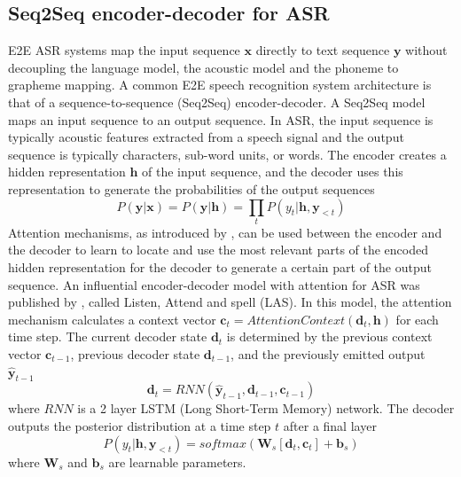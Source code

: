 \documentclass[11pt]{article}
\begin{document}
\subsection{Seq2Seq encoder-decoder for ASR}
E2E ASR systems map the input sequence $\boldsymbol x$ directly to text sequence $\boldsymbol y$ without decoupling the language model, the acoustic model and the phoneme to grapheme mapping. 
A common E2E speech recognition system architecture is that of a sequence-to-sequence (Seq2Seq) \citep{sutskever2014sequence} encoder-decoder. A Seq2Seq model maps an input sequence to an output sequence. In ASR, the input sequence is typically acoustic features extracted from a speech signal and the output sequence is typically characters, sub-word units, or words. The encoder creates a hidden representation $\boldsymbol h$ of the input sequence, and the decoder uses this representation to generate the probabilities of the output sequences
\begin{equation}
    P(\boldsymbol y|\boldsymbol x) = P(\boldsymbol y|\boldsymbol h) = 
    \prod_t P(y_t|\boldsymbol h, \boldsymbol{y}_{<t})
\end{equation}
Attention mechanisms, as introduced by \citet{bahdanau2014neural}, can be used between the encoder and the decoder to learn to locate and use the most relevant parts of the encoded hidden representation for the decoder to generate a certain part of the output sequence. An influential encoder-decoder model with attention for ASR was published by \citet{chan2016listen}, called Listen, Attend and spell (LAS). In this model, the attention mechanism calculates a context vector $\boldsymbol{c}_t = AttentionContext(\boldsymbol{d}_{t},\boldsymbol{h})$ for each time step. The current decoder state $\boldsymbol{d}_{t}$ is determined by the previous context vector $\boldsymbol{c}_{t-1}$, previous decoder state $\boldsymbol{d}_{t-1}$, and the previously emitted output $\hat{\boldsymbol{y}}_{t-1}$ 
\begin{equation}
    \boldsymbol{d}_{t} =
    RNN(\hat{\boldsymbol{y}}_{t-1}, \boldsymbol{d}_{t-1}, \boldsymbol{c}_{t-1})
\end{equation}
where $RNN$ is a 2 layer LSTM (Long Short-Term Memory) network.
The decoder  outputs the posterior distribution at a time step $t$ after a final layer
\begin{equation}
    P(y_t|\boldsymbol h, \boldsymbol{y}_{<t}) =
    softmax(\boldsymbol{W}_s[\boldsymbol{d}_{t}, \boldsymbol{c}_t] + \boldsymbol{b}_s)
\end{equation}
where $\boldsymbol{W}_s$ and $\boldsymbol{b}_s$ are learnable parameters.
\end{document}
